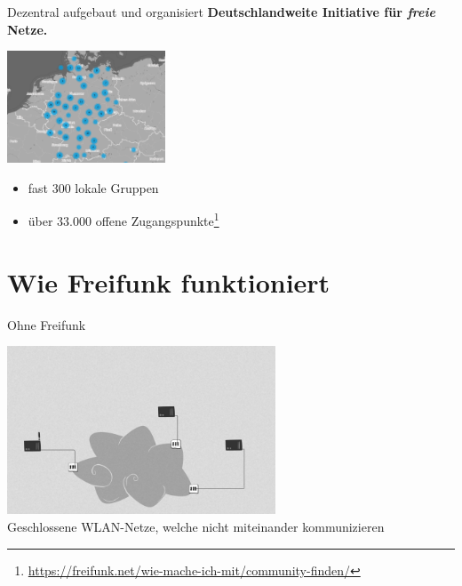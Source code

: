 \documentclass[10pt]{beamer}
\begin{document}
  \begin{frame}{Dezentral aufgebaut und organisiert}
      \large \textbf{Deutschlandweite Initiative für \emph{freie} Netze.}
      \begin{center}
        \includegraphics[height=9em]{images/2016-02-17_map-de}
      \end{center}
      \begin{itemize}
        \item fast 300 lokale Gruppen
        \item über 33.000 offene Zugangspunkte\footnote{\url{https://freifunk.net/wie-mache-ich-mit/community-finden/}}
      \end{itemize}
    \end{frame}

  \section{Wie Freifunk funktioniert}

  \begin{frame}{Ohne Freifunk}
    \begin{center}
      \includegraphics[height=5cm]{images/network_1}\\
      \vspace{1em}
      Geschlossene WLAN-Netze, welche nicht miteinander kommunizieren
      \vspace{1em}
    \end{center}
  \end{frame}
\end{document}
